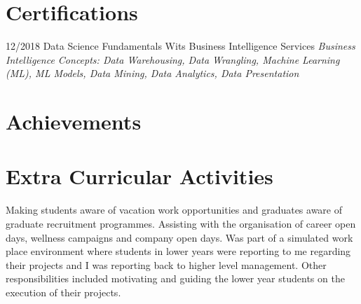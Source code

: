 \documentclass[]{friggeri-cv}
\begin{document}
\section{Certifications}
\begin{entrylist}
  \entry
    {12/2018}
    {Data Science Fundamentals}
    {Wits Business Intelligence Services}
    {\emph{Business Intelligence Concepts: Data Warehousing, Data Wrangling, Machine Learning (ML), ML Models, Data Mining, Data Analytics, Data Presentation}}
\end{entrylist}
\newpage
\section{Achievements}

\begin{entrylist}
    {\vspace{-0.2cm}}
    {\vspace{-0.2cm}}
\end{entrylist}

\section{Extra Curricular Activities}

\begin{entrylist}
    {Making students aware of vacation work opportunities and graduates aware of graduate recruitment programmes. Assisting with the organisation of career open days, wellness campaigns and company open days.}
    {Was part of a simulated work place environment where students in lower years were reporting to me regarding their projects and I was reporting back to higher level management. Other responsibilities included motivating and guiding the lower year students on the execution of their projects.}
\end{entrylist}
\end{document}
